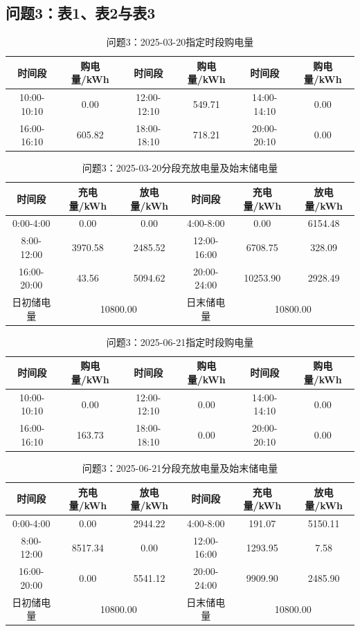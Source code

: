 \subsection{问题3：表1、表2与表3}
\begin{table}[H]\centering\scriptsize
\caption{问题3：2025-03-20指定时段购电量}
\begin{tabular}{cc|cc|cc}\toprule
时间段&购电量/kWh&时间段&购电量/kWh&时间段&购电量/kWh\\\midrule
10:00-10:10 & 0.00 & 12:00-12:10 & 549.71 & 14:00-14:10 & 0.00 \\
16:00-16:10 & 605.82 & 18:00-18:10 & 718.21 & 20:00-20:10 & 0.00 \\
\bottomrule\end{tabular}\end{table}
\begin{table}[H]\centering\scriptsize
\caption{问题3：2025-03-20分段充放电量及始末储电量}
\begin{tabular}{ccc|ccc}\toprule
时间段&充电量/kWh&放电量/kWh&时间段&充电量/kWh&放电量/kWh\\\midrule
0:00-4:00 & 0.00 & 0.00 & 4:00-8:00 & 0.00 & 6154.48 \\
8:00-12:00 & 3970.58 & 2485.52 & 12:00-16:00 & 6708.75 & 328.09 \\
16:00-20:00 & 43.56 & 5094.62 & 20:00-24:00 & 10253.90 & 2928.49 \\
\midrule 日初储电量&\multicolumn{2}{c|}{10800.00}&日末储电量&\multicolumn{2}{c}{10800.00}\\\bottomrule\end{tabular}\end{table}
\begin{table}[H]\centering\scriptsize
\caption{问题3：2025-06-21指定时段购电量}
\begin{tabular}{cc|cc|cc}\toprule
时间段&购电量/kWh&时间段&购电量/kWh&时间段&购电量/kWh\\\midrule
10:00-10:10 & 0.00 & 12:00-12:10 & 0.00 & 14:00-14:10 & 0.00 \\
16:00-16:10 & 163.73 & 18:00-18:10 & 0.00 & 20:00-20:10 & 0.00 \\
\bottomrule\end{tabular}\end{table}
\begin{table}[H]\centering\scriptsize
\caption{问题3：2025-06-21分段充放电量及始末储电量}
\begin{tabular}{ccc|ccc}\toprule
时间段&充电量/kWh&放电量/kWh&时间段&充电量/kWh&放电量/kWh\\\midrule
0:00-4:00 & 0.00 & 2944.22 & 4:00-8:00 & 191.07 & 5150.11 \\
8:00-12:00 & 8517.34 & 0.00 & 12:00-16:00 & 1293.95 & 7.58 \\
16:00-20:00 & 0.00 & 5541.12 & 20:00-24:00 & 9909.90 & 2485.90 \\
\midrule 日初储电量&\multicolumn{2}{c|}{10800.00}&日末储电量&\multicolumn{2}{c}{10800.00}\\\bottomrule\end{tabular}\end{table}
